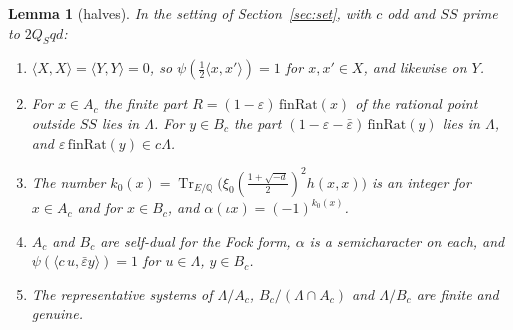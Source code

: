 \documentclass[11pt]{article}
\newcommand{\Tr}{\operatorname{Tr}}
\newtheorem{lemma}[theorem]{Lemma}
\theoremstyle{remark}
\begin{document}
\begin{lemma}[halves]\label{lem:halves}
In the setting of Section~\ref{sec:set}, with $c$ odd and $SS$ prime to $2Q_Sqd$:
\begin{enumerate}[label=(\alph*),itemsep=1pt]
\item $\langle X,X\rangle=\langle Y,Y\rangle=0$, so $\psi(\tfrac12\langle x,x'\rangle)=1$ for $x,x'\in X$, and likewise on $Y$.
\item For $x\in A_c$ the finite part $R=(1-\varepsilon)\,\mathrm{finRat}(x)$ of the rational point outside $SS$ lies in $\Lambda$. For $y\in B_c$ the part $(1-\varepsilon-\bar\varepsilon)\,\mathrm{finRat}(y)$ lies in $\Lambda$, and $\varepsilon\,\mathrm{finRat}(y)\in c\Lambda$.
\item The number $k_0(x)=\Tr_{E/\mathbb Q}\bigl(\xi_0(\tfrac{1+\sqrt{-d}}2)^2h(x,x)\bigr)$ is an integer for $x\in A_c$ and for $x\in B_c$, and $\alpha(\iota x)=(-1)^{k_0(x)}$.
\item $A_c$ and $B_c$ are self-dual for the Fock form, $\alpha$ is a semicharacter on each, and $\psi(\langle c\,u,\bar\varepsilon y\rangle)=1$ for $u\in\Lambda$, $y\in B_c$.
\item The representative systems of $\Lambda/A_c$, $B_c/(\Lambda\cap A_c)$ and $\Lambda/B_c$ are finite and genuine.
\end{enumerate}
\end{lemma}
\end{document}
